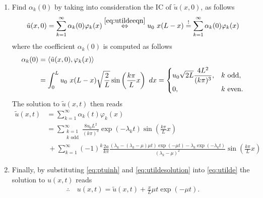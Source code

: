\documentclass[12pt]{article}
\begin{document}
\begin{enumerate}
	\item Find $\alpha_k(0)$ by taking into consideration the IC of $\tilde{u}(x,0)$, as follows
	      \begin{align}
		      \tilde{u}(x,0) = \sum_{k=1}^{\infty} \alpha_k(0) \varphi_k(x)
		      \stackrel{\eqref{eq:utildeeqn}}{\Leftrightarrow}
		      u_0\ x(L-x) \stackrel{!}{=} \sum_{k=1}^{\infty} \alpha_k(0) \varphi_k(x)
	      \end{align}
	      where the coefficient $\alpha_k(0)$ is computed as follows
	      \begin{align}
		      \alpha_k(0)
		       & = \langle \tilde{u}(x,0),\varphi_k(x) \rangle                                           \notag \\
		       & = \int_0^L u_0\ x (L-x) \sqrt{\frac{2}{L}} \sin\left( \frac{k \pi}{L} x \right) \ dx 
		      =
		      \begin{cases}
			      \displaystyle
			      u_0 \sqrt{2L} \frac{4 L^2}{(k\pi)^3}, & k \text{ odd}, \\
			      0,                                    & k\text{ even}.
		      \end{cases}
	      \end{align}
	      The solution to $\tilde{u}(x,t)$ then reads
	      \begin{equation}
		      \label{eq:utildesolution}
		      \boxed{
			      \begin{aligned}
				      \tilde{u}(x,t)
				       & = \sum_{k=1}^\infty \alpha_k(t) \varphi_k(x)  \\
				       & = \sum_{\substack{k=1                         \\k \text{ odd}}}^\infty \frac{8 u_0 L^2}{(k\pi)^3}
				      \exp(-\lambda_k t)
				      \sin\left( \frac{k \pi}{L} x \right)             \\
				       & \ + \sum_{k=1}^\infty (-1)^k \frac{2a}{k \pi}
				      \frac{(\lambda_k - (\lambda_k-\mu)\mu t)\exp(-\mu t) - \lambda_k \exp(-\lambda_k t)}
				      {(\lambda_k - \mu)^2}
				      \sin\left( \frac{k \pi}{L} x \right)
			      \end{aligned}
		      }
	      \end{equation}
	      
	\item Finally, by substituting \eqref{eq:ptuinh} and \eqref{eq:utildesolution}
	      into  \eqref{eq:utilde}
	      the solution to $u(x,t)$ reads
	      \begin{align*}
		      \therefore\quad\boxed{
			      u(x,t) = \tilde{u}(x,t) + \frac{x}{L} \mu t\exp(-\mu t).
		      }
	      \end{align*}
\end{enumerate}
\end{document}
